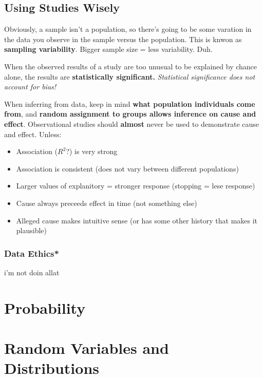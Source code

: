 \documentclass[12pt, a4paper]{article}
\theoremstyle{definition}
\begin{document}
\subsection{Using Studies Wisely}

Obviously, a sample isn't a population, so there's going to be some varation in the data you observe in the sample versus the population.
This is knwon as \textbf{sampling variability}.
Bigger sample size = less variability. Duh.

When the observed results of a study are too unusual to be explained by chance alone, the results are \textbf{statistically significant.}
\textit{Statistical significance does not account for bias!}

When inferring from data, keep in mind \textbf{what population individuals come from}, and \textbf{random assignment to groups allows inference on cause and effect}.
Observational studies should \textbf{almost} never be used to demonstrate cause and effect. Unless:
\begin{itemize}
    \item Association ($R^2$?) is very strong
    \item Association is consistent (does not vary between different populations)
    \item Larger values of explanitory = stronger response (stopping = lese response)
    \item Cause always preceeds effect in time (not something else)
    \item Alleged cause makes intuitive sense (or has some other history that makes it plausible)
\end{itemize}

\subsubsection{Data Ethics*}
i'm not doin allat

\newpage

\section{Probability}

\newpage

\section{Random Variables and Distributions}

\newpage
\end{document}
